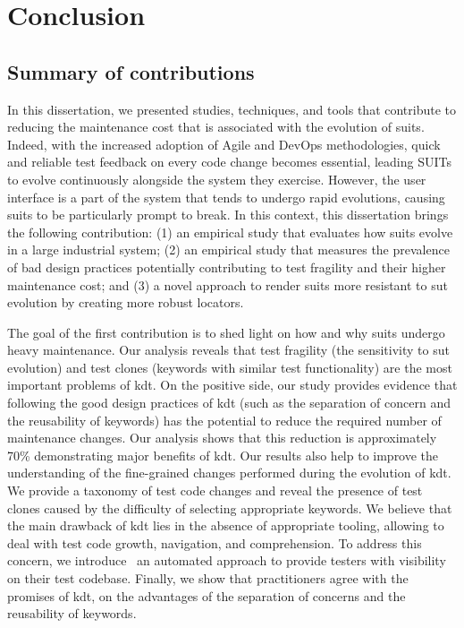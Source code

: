 \chapter{Conclusion}
\label{chap:conclusion}


\section{Summary of contributions}

In this dissertation, we presented studies, techniques, and tools that contribute to reducing the maintenance cost that is associated with the evolution of \gls{suit}s. Indeed, with the increased adoption of Agile and DevOps methodologies, quick and reliable test feedback on every code change becomes essential, leading SUITs to evolve continuously alongside the system they exercise. However,  the user interface is a part of the system that tends to undergo rapid evolutions, causing \gls{suit}s to be particularly prompt to break. In this context, this dissertation brings the following contribution: (1) an empirical study that evaluates how \gls{suit}s evolve in a large industrial system; (2) an empirical study that measures the prevalence of bad design practices potentially contributing to test fragility and their higher maintenance cost; and (3) a novel approach to render \gls{suit}s more resistant to \gls{sut} evolution by creating more robust locators.

The goal of the first contribution is to shed light on how and why \gls{suit}s undergo heavy maintenance. Our analysis reveals that test fragility (the sensitivity to \gls{sut} evolution) and test clones (keywords with similar test functionality) are the most important problems of \gls{kdt}. On the positive side, our study provides evidence that following the good design practices of \gls{kdt} (such as the separation of concern and the reusability of keywords) has the potential to reduce the required number of maintenance changes. Our analysis shows that this reduction is approximately 70\% demonstrating major benefits of \gls{kdt}. Our results also help to improve the understanding of the fine-grained changes performed during the evolution of \gls{kdt}.  We provide a taxonomy of test code changes and reveal the presence of test clones caused by the difficulty of selecting appropriate keywords. We believe that the main drawback of \gls{kdt} lies in the absence of appropriate tooling, allowing to deal with test code growth, navigation, and comprehension. To address this concern, we introduce \tool\, an automated approach to provide testers with visibility on their test codebase. Finally, we show that practitioners agree with the promises of \gls{kdt}, on the advantages of the separation of concerns and the reusability of keywords. 

